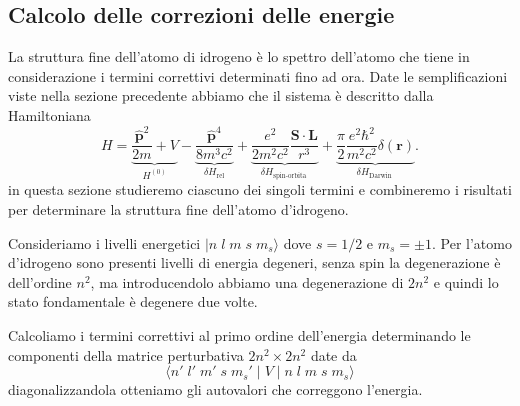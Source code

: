 \subsection{Calcolo delle correzioni delle energie}

La struttura fine dell'atomo di idrogeno \`e lo spettro dell'atomo che tiene in considerazione i termini correttivi determinati fino ad ora. Date le semplificazioni viste nella sezione precedente 
\newpage
abbiamo che il sistema \`e descritto dalla Hamiltoniana 
\begin{equation}
	H=\underbrace{\frac{\hat{\mathbf{p}}^2}{2 m}+V}_{H^{(0)}}-\underbrace{\frac{\hat{\mathbf{p}}^4}{8 m^3 c^2}}_{\delta H_{\text {rel}}}+\underbrace{\frac{e^2}{2 m^2 c^2} \frac{\mathbf{S} \cdot \mathbf{L}}{r^3}}_{\delta H_{\text {spin-orbita }}}+\underbrace{\frac{\pi}{2} \frac{e^2 \hbar^2}{m^2 c^2} \delta(\mathbf{r})}_{\delta H_{\text {Darwin }}} .
\end{equation}
in questa sezione studieremo ciascuno dei singoli termini  e combineremo i risultati per determinare la struttura fine dell'atomo d'idrogeno.

Consideriamo i livelli energetici $|n\;l\;m\;s \;m_s \rangle $ dove $s = 1/2$ e $m_s = \pm 1$. Per l'atomo d'idrogeno sono presenti livelli di energia degeneri, senza spin la degenerazione \`e dell'ordine $n^2$, ma introducendolo abbiamo una degenerazione di $2n^2$ e quindi lo stato fondamentale \`e degenere due volte.

Calcoliamo i termini correttivi al primo ordine dell'energia determinando le componenti della matrice perturbativa $2n^2 \times 2n^2$ date da
\begin{equation*}
	\langle n' \; l' \; m' \; s \; m_s' \mid V \mid n \; l \; m \; s \; m_s \rangle 
\end{equation*}
diagonalizzandola otteniamo gli autovalori che correggono l'energia.

